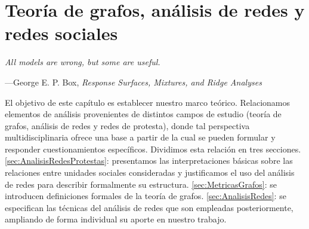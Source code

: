 \documentclass[letterpaper, 11pt]{book}
\theoremstyle{definition}
\theoremstyle{remark}
\begin{document}
\chapter{Teoría de grafos, análisis de redes y redes sociales}
\label{chap:TeoriaRedes}

\epigraph{\itshape All models are wrong, but some are useful.}{---George E. P. Box, \textit{Response Surfaces, Mixtures, and Ridge Analyses}}

\begingroup
\small
    El objetivo de este capítulo es establecer nuestro marco teórico. 
    Relacionamos elementos de análisis provenientes de distintos campos de estudio (teoría de grafos, análisis de redes y redes de protesta), donde tal perspectiva multidisciplinaria ofrece una base a partir de la cual se pueden formular y responder cuestionamientos específicos. 
    Dividimos esta relación en tres secciones. 
    \ref{sec:AnalisisRedesProtestas}: presentamos las interpretaciones básicas sobre las relaciones entre unidades sociales consideradas y justificamos el uso del análisis de redes para describir formalmente su estructura.
    \ref{sec:MetricasGrafos}: se introducen definiciones formales de la teoría de grafos. 
    \ref{sec:AnalisisRedes}: se especifican las técnicas del análisis de redes que son empleadas posteriormente, ampliando de forma individual su aporte en nuestro trabajo. 
\vspace{2em}
\endgroup
\end{document}
